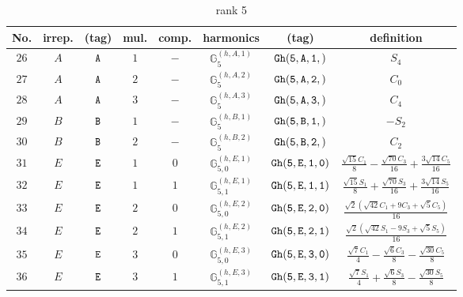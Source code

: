 \documentclass[fleqn,8pt]{jsarticle}
\begin{document}
\begin{table}[ht!]
\begin{center}
\caption{rank 5}
\renewcommand{\arraystretch}{1.3}
\begin{tabular}{cccccccc} \hline \hline
No. & irrep. & (tag) & mul. & comp. & harmonics & (tag) & definition \\ \hline
$ 26 $ & $ A $ & $ {\tt A} $ & $ 1 $ & $ - $ & $ \mathbb{G}_{5}^{(h,A,1)} $ & $ {\tt Gh(5,A,1,)} $ & $ S_{4} $ \\
$ 27 $ & $ A $ & $ {\tt A} $ & $ 2 $ & $ - $ & $ \mathbb{G}_{5}^{(h,A,2)} $ & $ {\tt Gh(5,A,2,)} $ & $ C_{0} $ \\
$ 28 $ & $ A $ & $ {\tt A} $ & $ 3 $ & $ - $ & $ \mathbb{G}_{5}^{(h,A,3)} $ & $ {\tt Gh(5,A,3,)} $ & $ C_{4} $ \\
$ 29 $ & $ B $ & $ {\tt B} $ & $ 1 $ & $ - $ & $ \mathbb{G}_{5}^{(h,B,1)} $ & $ {\tt Gh(5,B,1,)} $ & $ - S_{2} $ \\
$ 30 $ & $ B $ & $ {\tt B} $ & $ 2 $ & $ - $ & $ \mathbb{G}_{5}^{(h,B,2)} $ & $ {\tt Gh(5,B,2,)} $ & $ C_{2} $ \\
$ 31 $ & $ E $ & $ {\tt E} $ & $ 1 $ & $ 0 $ & $ \mathbb{G}_{5,0}^{(h,E,1)} $ & $ {\tt Gh(5,E,1,0)} $ & $ \frac{\sqrt{15} C_{1}}{8} - \frac{\sqrt{70} C_{3}}{16} + \frac{3 \sqrt{14} C_{5}}{16} $ \\
$ 32 $ & $ E $ & $ {\tt E} $ & $ 1 $ & $ 1 $ & $ \mathbb{G}_{5,1}^{(h,E,1)} $ & $ {\tt Gh(5,E,1,1)} $ & $ \frac{\sqrt{15} S_{1}}{8} + \frac{\sqrt{70} S_{3}}{16} + \frac{3 \sqrt{14} S_{5}}{16} $ \\
$ 33 $ & $ E $ & $ {\tt E} $ & $ 2 $ & $ 0 $ & $ \mathbb{G}_{5,0}^{(h,E,2)} $ & $ {\tt Gh(5,E,2,0)} $ & $ \frac{\sqrt{2} \left(\sqrt{42} C_{1} + 9 C_{3} + \sqrt{5} C_{5}\right)}{16} $ \\
$ 34 $ & $ E $ & $ {\tt E} $ & $ 2 $ & $ 1 $ & $ \mathbb{G}_{5,1}^{(h,E,2)} $ & $ {\tt Gh(5,E,2,1)} $ & $ \frac{\sqrt{2} \left(\sqrt{42} S_{1} - 9 S_{3} + \sqrt{5} S_{5}\right)}{16} $ \\
$ 35 $ & $ E $ & $ {\tt E} $ & $ 3 $ & $ 0 $ & $ \mathbb{G}_{5,0}^{(h,E,3)} $ & $ {\tt Gh(5,E,3,0)} $ & $ \frac{\sqrt{7} C_{1}}{4} - \frac{\sqrt{6} C_{3}}{8} - \frac{\sqrt{30} C_{5}}{8} $ \\
$ 36 $ & $ E $ & $ {\tt E} $ & $ 3 $ & $ 1 $ & $ \mathbb{G}_{5,1}^{(h,E,3)} $ & $ {\tt Gh(5,E,3,1)} $ & $ \frac{\sqrt{7} S_{1}}{4} + \frac{\sqrt{6} S_{3}}{8} - \frac{\sqrt{30} S_{5}}{8} $ \\
 \hline \hline
\end{tabular}
\end{center}
\end{table}
\end{document}
